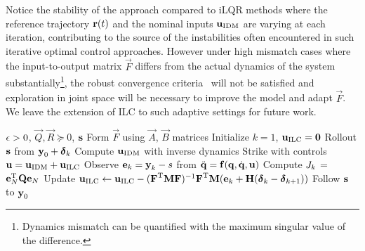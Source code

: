 
Notice the stability of the approach compared to iLQR methods where the reference trajectory $\boldsymbol{\mathrm{r}}(t)$ and the nominal inputs $\boldsymbol{\mathrm{u}}_{\mathrm{IDM}}$ are varying at each iteration, contributing to the source of the instabilities often encountered in such iterative optimal control approaches. However under high mismatch cases where the input-to-output matrix $\vec{F}$ differs from the actual dynamics of the system substantially\footnote{Dynamics mismatch can be quantified with the maximum singular value of the difference.}, the robust convergence criteria~\cite{Bristow06} will not be satisfied and exploration in joint space will be necessary to improve the model and adapt $\vec{F}$. We leave the extension of ILC to such adaptive settings for future work.

\begin{algorithm}[tb]
   \caption{\alg}
   \label{alg1}
\begin{algorithmic}
    $\epsilon > 0$, $\vec{Q}, \vec{R} \succeq 0$, $\boldsymbol{\mathrm{s}}$ 
   \STATE Form $\vec{F}$ using $\vec{A}$, $\vec{B}$ matrices
   \STATE Initialize $k = 1$, $\boldsymbol{\mathrm{u}}_{\mathrm{ILC}} = \boldsymbol{\mathrm{0}}$
   \REPEAT 
   	   \STATE Rollout $\boldsymbol{\mathrm{s}}$ from $\boldsymbol{\mathrm{y}}_0 + \boldsymbol{\mathrm{\delta}}_k$ 
   	   \STATE Compute $\boldsymbol{\mathrm{u}}_{\mathrm{IDM}}$ with inverse dynamics
 	   \STATE Strike with controls $\boldsymbol{\mathrm{u}} = \boldsymbol{\mathrm{u}}_{\mathrm{IDM}} + \boldsymbol{\mathrm{u}}_{\mathrm{ILC}}$  %
 	   \STATE Observe $\boldsymbol{\mathrm{e}}_k = \boldsymbol{\mathrm{y}}_k - s$ from $\ddot{\boldsymbol{\mathrm{q}}} = \boldsymbol{\mathrm{f}}(\boldsymbol{\mathrm{q}},\dot{\boldsymbol{\mathrm{q}}},\boldsymbol{\mathrm{u}})$
 	   \STATE Compute $J_k$ = $\boldsymbol{\mathrm{e}}_N^{\mathrm{T}}\boldsymbol{\mathrm{Q}}\boldsymbol{\mathrm{e}}_N$
 	   \STATE Update $\boldsymbol{\mathrm{u}}_{\mathrm{ILC}} \leftarrow \boldsymbol{\mathrm{u}}_{\mathrm{ILC}} - (\boldsymbol{\mathrm{F}}^{\mathrm{T}}\boldsymbol{\mathrm{M}}\boldsymbol{\mathrm{F}})^{-1}\boldsymbol{\mathrm{F}}^{\mathrm{T}}\boldsymbol{\mathrm{M}}(\boldsymbol{\mathrm{e}}_k + \boldsymbol{\mathrm{H}}(\boldsymbol{\mathrm{\delta}}_k - \boldsymbol{\mathrm{\delta}}_{k+1}))$
 	   \STATE Follow $\boldsymbol{\mathrm{s}}$ to $\boldsymbol{\mathrm{y}}_0$
\end{algorithmic}
\end{algorithm}